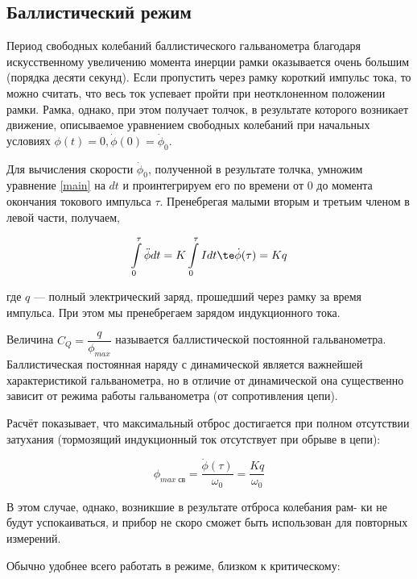 \documentclass[12pt]{kiarticle}
\begin{document}
	\subsection{Баллистический режим}
	
	Период свободных колебаний баллистического гальванометра благодаря искусственному увеличению момента инерции рамки оказывается очень большим (порядка десяти секунд). Если пропустить через рамку короткий импульс тока, то можно считать, что весь ток успевает пройти при неотклоненном положении рамки. Рамка, однако, при этом получает толчок, в результате которого возникает движение, описываемое уравнением свободных колебаний при начальных условиях $ \phi(t) = 0, \dot{\phi }(0) = \dot{\phi }_0 $.

	Для вычисления скорости $ \dot{\phi }_0 $, полученной в результате толчка, умножим уравнение \eqref{main} на $ dt $ и проинтегрируем его по времени от 0 до момента окончания токового импульса $ \tau $. Пренебрегая малыми вторым и третьим членом в левой части, получаем,
	
	\begin{equation}\label{q}
	\int\limits_0^\tau \ddot{\phi}dt = K 	\int\limits_0^\tau I dt \te \dot{\phi }(\tau) = Kq
	\end{equation}
	
	где $ q $ --- полный электрический заряд, прошедший через рамку за время импульса. При этом мы пренебрегаем зарядом индукционного тока.
	
	
	Величина $ C_Q = \dfrac{q}{\phi_{max}}$ называется баллистической постоянной гальванометра. Баллистическая постоянная наряду с динамической является важнейшей характеристикой гальванометра, но в отличие от динамической она существенно зависит от режима работы гальванометра (от сопротивления цепи).
	
	Расчёт показывает, что максимальный отброс достигается при полном
	отсутствии затухания (тормозящий индукционный ток отсутствует при
	обрыве в цепи):
	
	\begin{equation}\label{}
	\phi_{max \; св} = \dfrac{\dot{\phi }(\tau) }{\omega_0} = \dfrac{Kq}{\omega_0}
	\end{equation}
	
	В этом случае, однако, возникшие в результате отброса колебания рам-
	ки не будут успокаиваться, и прибор не скоро сможет быть использован
	для повторных измерений.
	
	Обычно удобнее всего работать в режиме, близком к критическому:
	
\end{document}
